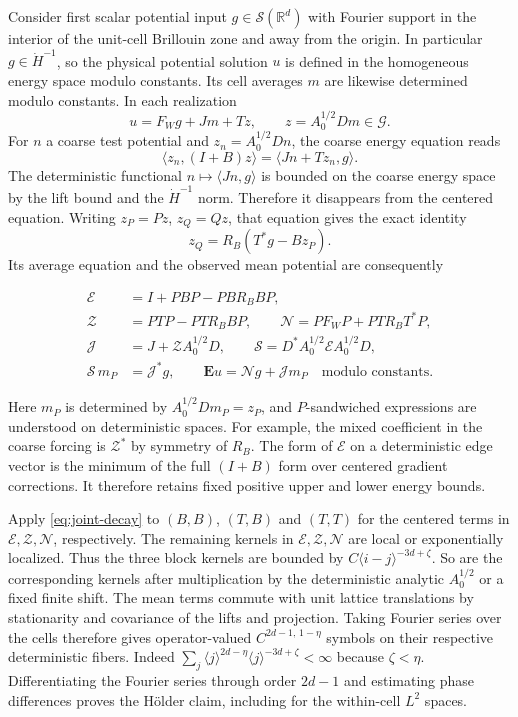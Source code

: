 \documentclass[11pt]{article}
\begin{document}
Consider first scalar potential input \(g\in\mathcal S(\mathbb R^d)\) with Fourier support in the interior of the unit-cell Brillouin zone and away from the origin. In particular \(g\in\dot H^{-1}\), so the physical potential solution \(u\) is defined in the homogeneous energy space modulo constants. Its cell averages \(m\) are likewise determined modulo constants. In each realization \[
u=F_W g+Jm+T z,\qquad z=A_0^{1/2}D m\in\mathcal G.
\] For \(n\) a coarse test potential and \(z_n=A_0^{1/2}D n\), the coarse energy equation reads \[
\langle z_n,(I+B)z\rangle=\langle Jn+T z_n,g\rangle .
\] The deterministic functional \(n\mapsto\langle Jn,g\rangle\) is bounded on the coarse energy space by the lift bound and the \(\dot H^{-1}\) norm. Therefore it disappears from the centered equation. Writing \(z_P=Pz\), \(z_Q=Qz\), that equation gives the exact identity \[
z_Q=R_B(T^*g-Bz_P).
\] Its average equation and the observed mean potential are consequently

\begin{equation}\label{eq:coarse-schur}
\begin{aligned}
\mathcal E&=I+P B P-P B R_B B P,\\
\mathcal Z&=P T P-P T R_B B P,\qquad
\mathcal N=P F_W P+P T R_B T^* P,\\
\mathcal J&=J+\mathcal Z A_0^{1/2}D,\qquad
\mathcal S=D^* A_0^{1/2}\mathcal E A_0^{1/2}D,\\
\mathcal S\,m_P&=\mathcal J^*g,\qquad \mathbf E u=\mathcal N g+\mathcal J m_P
\quad\text{modulo constants}.
\end{aligned}
\end{equation}

Here \(m_P\) is determined by \(A_0^{1/2}D m_P=z_P\), and \(P\)-sandwiched expressions are understood on deterministic spaces. For example, the mixed coefficient in the coarse forcing is \(\mathcal Z^*\) by symmetry of \(R_B\). The form of \(\mathcal E\) on a deterministic edge vector is the minimum of the full \((I+B)\) form over centered gradient corrections. It therefore retains fixed positive upper and lower energy bounds.

Apply \eqref{eq:joint-decay} to \((B,B)\), \((T,B)\) and \((T,T)\) for the centered terms in \(\mathcal E,\mathcal Z,\mathcal N\), respectively. The remaining kernels in \(\mathcal E,\mathcal Z,\mathcal N\) are local or exponentially localized. Thus the three block kernels are bounded by \(C\langle i-j\rangle^{-3d+\zeta}\). So are the corresponding kernels after multiplication by the deterministic analytic \(A_0^{1/2}\) or a fixed finite shift. The mean terms commute with unit lattice translations by stationarity and covariance of the lifts and projection. Taking Fourier series over the cells therefore gives operator-valued \(C^{2d-1,\,1-\eta}\) symbols on their respective deterministic fibers. Indeed \(\sum_{j}\langle j\rangle^{2d-\eta}\langle j\rangle^{-3d+\zeta}<\infty\) because \(\zeta<\eta\). Differentiating the Fourier series through order \(2d-1\) and estimating phase differences proves the Hölder claim, including for the within-cell \(L^2\) spaces.
\end{document}
